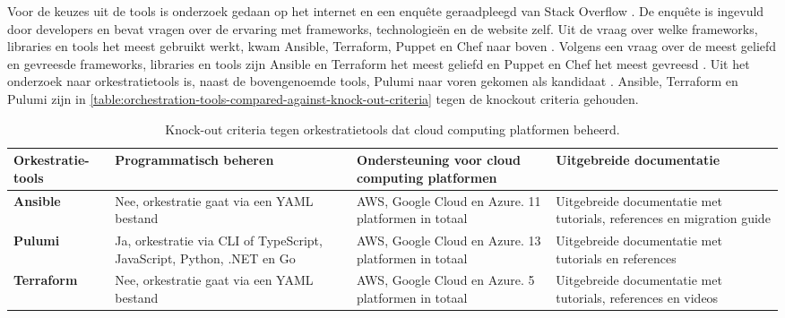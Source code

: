\newpage

Voor de keuzes uit de tools is onderzoek gedaan op het internet en een enquête geraadpleegd van Stack Overflow \cite{stack-overflow-survey-2020}. De enquête is ingevuld door developers en bevat vragen over de ervaring met frameworks, technologieën en de website zelf. Uit de vraag over welke frameworks, libraries en tools het meest gebruikt werkt, kwam Ansible, Terraform, Puppet en Chef naar boven \cite{stack-overflow-survey-2020-popular-framework-libraries-tools}. Volgens een vraag over de meest geliefd en gevreesde frameworks, libraries en tools zijn Ansible en Terraform het meest geliefd en Puppet en Chef het meest gevreesd \cite{stack-overflow-survey-2020-loved-dreaded-framework-libraries-tools}. Uit het onderzoek naar orkestratietools is, naast de bovengenoemde tools, Pulumi naar voren gekomen als kandidaat \cite{pulumi}. Ansible, Terraform en Pulumi zijn in \autoref{table:orchestration-tools-compared-against-knock-out-criteria} tegen de knockout criteria gehouden.

\begin{table}[hbt!]
  \centering
  \begin{tabular}{|p{.15\linewidth}|p{.245\linewidth}|p{.245\linewidth}|p{.245\linewidth}|}
  \hline
  \textbf{Orkestratie-\newline tools} & \textbf{Programmatisch \newline beheren} & \textbf{Ondersteuning voor cloud computing \newline platformen} & \textbf{Uitgebreide \newline documentatie} \\ \hline
    \textbf{Ansible} &
    Nee, orkestratie gaat via een YAML bestand \cite{ansible-code} &
    AWS, Google Cloud en Azure. 11 platformen in totaal \cite{ansible-cloud-platforms} &
    Uitgebreide documentatie met tutorials, references en migration guide \cite{ansible-docs}
    \\ \hline

    \textbf{Pulumi} &
    Ja, orkestratie via CLI of TypeScript, JavaScript, Python, .NET en Go \cite{pulumi-code} &
    AWS, Google Cloud en Azure. 13 platformen in totaal \cite{pulumi-cloud-platforms} &
    Uitgebreide documentatie met tutorials en references \cite{pulumi-docs}
    \\ \hline

    \textbf{Terraform} &
    Nee, orkestratie gaat via een YAML bestand \cite{terraform-code} &
    AWS, Google Cloud en Azure. 5 platformen in totaal \cite{terraform-cloud-platforms} &
    Uitgebreide documentatie met tutorials, references en videos \cite{terraform-docs}
    \\ \hline
  \end{tabular}
  \caption{Knock-out criteria tegen orkestratietools dat cloud computing platformen beheerd.}
  \label{table:orchestration-tools-compared-against-knock-out-criteria}
\end{table}

